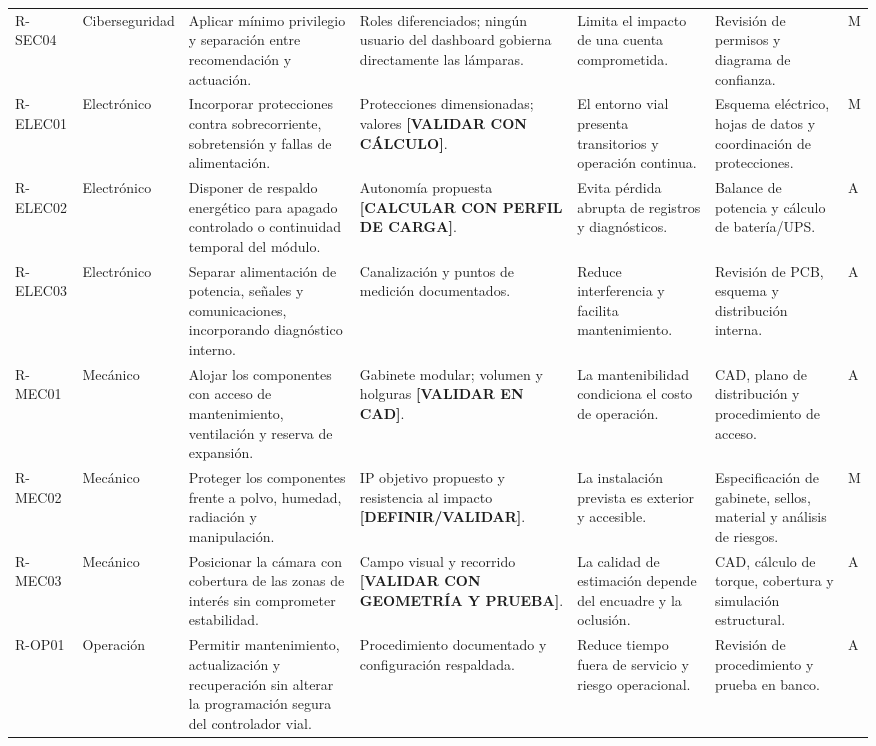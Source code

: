 \documentclass[12pt,a4paper,oneside]{report}
\begin{document}
\begin{landscape}
\begin{longtable}{@{}p{1.15cm}p{1.65cm}p{5.25cm}p{3.15cm}p{4.35cm}p{3.65cm}p{1.25cm}@{}}
R-SEC04 & Ciberseguridad & Aplicar mínimo privilegio y separación entre recomendación y actuación. & Roles diferenciados; ningún usuario del dashboard gobierna directamente las lámparas. & Limita el impacto de una cuenta comprometida. & Revisión de permisos y diagrama de confianza. & M\\
R-ELEC01 & Electrónico & Incorporar protecciones contra sobrecorriente, sobretensión y fallas de alimentación. & Protecciones dimensionadas; valores \textbf{[VALIDAR CON CÁLCULO]}. & El entorno vial presenta transitorios y operación continua. & Esquema eléctrico, hojas de datos y coordinación de protecciones. & M\\
R-ELEC02 & Electrónico & Disponer de respaldo energético para apagado controlado o continuidad temporal del módulo. & Autonomía propuesta \textbf{[CALCULAR CON PERFIL DE CARGA]}. & Evita pérdida abrupta de registros y diagnósticos. & Balance de potencia y cálculo de batería/UPS. & A\\
R-ELEC03 & Electrónico & Separar alimentación de potencia, señales y comunicaciones, incorporando diagnóstico interno. & Canalización y puntos de medición documentados. & Reduce interferencia y facilita mantenimiento. & Revisión de PCB, esquema y distribución interna. & A\\
R-MEC01 & Mecánico & Alojar los componentes con acceso de mantenimiento, ventilación y reserva de expansión. & Gabinete modular; volumen y holguras \textbf{[VALIDAR EN CAD]}. & La mantenibilidad condiciona el costo de operación. & CAD, plano de distribución y procedimiento de acceso. & A\\
R-MEC02 & Mecánico & Proteger los componentes frente a polvo, humedad, radiación y manipulación. & IP objetivo propuesto y resistencia al impacto \textbf{[DEFINIR/VALIDAR]}. & La instalación prevista es exterior y accesible. & Especificación de gabinete, sellos, material y análisis de riesgos. & M\\
R-MEC03 & Mecánico & Posicionar la cámara con cobertura de las zonas de interés sin comprometer estabilidad. & Campo visual y recorrido \textbf{[VALIDAR CON GEOMETRÍA Y PRUEBA]}. & La calidad de estimación depende del encuadre y la oclusión. & CAD, cálculo de torque, cobertura y simulación estructural. & A\\
R-OP01 & Operación & Permitir mantenimiento, actualización y recuperación sin alterar la programación segura del controlador vial. & Procedimiento documentado y configuración respaldada. & Reduce tiempo fuera de servicio y riesgo operacional. & Revisión de procedimiento y prueba en banco. & A\\

\end{longtable}
\end{landscape}
\end{document}
